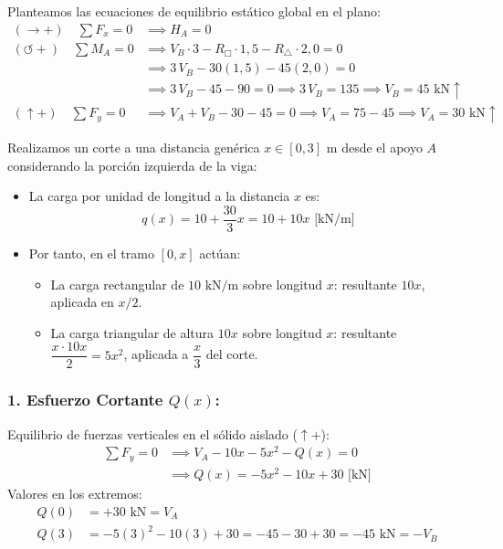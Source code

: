 Planteamos las ecuaciones de equilibrio estático global en el plano:
\begin{align}
    (\rightarrow +) \quad \sum F_x = 0 & \implies \boxed{H_A = 0} \\[6pt]
    (\circlearrowleft +) \quad \sum M_A = 0 & \implies V_B \cdot 3 - R_{\Box} \cdot 1{,}5 - R_{\triangle} \cdot 2{,}0 = 0 \nonumber \\
                                           & \implies 3\,V_B - 30(1{,}5) - 45(2{,}0) = 0 \nonumber \\
                                           & \implies 3\,V_B - 45 - 90 = 0 \implies 3\,V_B = 135 \implies \boxed{V_B = 45\text{ kN}\uparrow} \\[6pt]
    (\uparrow +) \quad \sum F_y = 0 & \implies V_A + V_B - 30 - 45 = 0 \implies V_A = 75 - 45 \implies \boxed{V_A = 30\text{ kN}\uparrow}
\end{align}


Realizamos un corte a una distancia genérica $x \in [0, 3]\text{ m}$ desde el apoyo $A$ considerando la porción izquierda de la viga:
\begin{itemize}
    \item La carga por unidad de longitud a la distancia $x$ es:
          \begin{equation}
              q(x) = 10 + \frac{30}{3}x = 10 + 10x\text{ [kN/m]}
          \end{equation}
    \item Por tanto, en el tramo $[0, x]$ actúan:
          \begin{itemize}
              \item La carga rectangular de $10\text{ kN/m}$ sobre longitud $x$: resultante $10x$, aplicada en $x/2$.
              \item La carga triangular de altura $10x$ sobre longitud $x$: resultante $\dfrac{x \cdot 10x}{2} = 5x^2$, aplicada a $\dfrac{x}{3}$ del corte.
          \end{itemize}
\end{itemize}

\subsubsection*{1. Esfuerzo Cortante $Q(x)$:}
Equilibrio de fuerzas verticales en el sólido aislado ($\uparrow +$):
\begin{align}
    \sum F_y = 0 & \implies V_A - 10x - 5x^2 - Q(x) = 0 \nonumber \\
                 & \implies \boxed{Q(x) = -5x^2 - 10x + 30\text{ [kN]}}
\end{align}
Valores en los extremos:
\begin{align}
    Q(0) & = +30\text{ kN} = V_A \\[4pt]
    Q(3) & = -5(3)^2 - 10(3) + 30 = -45 - 30 + 30 = -45\text{ kN} = -V_B
\end{align}


